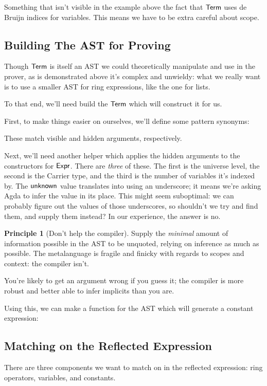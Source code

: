 \documentclass[draft, twocolumn]{article}
\theoremstyle{definition}
\theoremstyle{definition}
\newtheorem{principle}{Principle}[section]
\begin{document}
Something that isn't visible in the example above the fact that
\(\AgdaDatatype{Term}\) uses de Bruijn indices for variables. This means we have
to be extra careful about scope.

\subsection{Building The AST for Proving}
Though \(\AgdaDatatype{Term}\) is itself an AST we could theoretically
manipulate and use in the prover, as is demonstrated above it's complex and
unwieldy: what we really want is to use a smaller AST for ring expressions, like
the one for lists.

To that end, we'll need build the \(\AgdaDatatype{Term}\) which will construct
it for us.

First, to make things easier on ourselves, we'll define some pattern synonyms:

These match visible and hidden arguments, respectively.

Next, we'll need another helper which applies the hidden arguments to the
constructors for \(\AgdaDatatype{Expr}\). There are \emph{three} of these. The
first is the universe level, the second is the Carrier type, and the third is
the number of variables it's indexed by.
The \(\AgdaInductiveConstructor{unknown}\) value translates into using an
underscore; it means we're asking Agda to infer the value in its place. This
might seem suboptimal: we can probably figure out the values of those
underscores, so shouldn't we try and find them, and supply them instead? In our
experience, the answer is no.

\begin{principle}[Don't help the compiler]
  Supply the \emph{minimal} amount of information possible in the AST to be
  unquoted, relying on inference as much as possible. The metalanguage is
  fragile and finicky with regards to scopes and context: the compiler isn't.

  You're likely to get an argument wrong if you guess it; the compiler is more
  robust and better able to infer implicits than you are.
\end{principle}

Using this, we can make a function for the AST which will generate a constant
expression:
\subsection{Matching on the Reflected Expression}
There are three components we want to match on in the reflected expression: ring
operators, variables, and constants.
\end{document}
